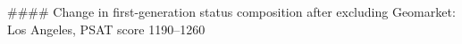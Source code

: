 #### Change in first-generation status composition after excluding Geomarket: Los Angeles, PSAT score 1190–1260
